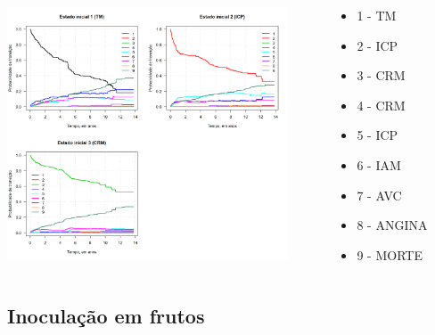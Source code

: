 \begin{frame}

\vspace{-.35cm}\begin{columns}
 \begin{column}{.9\textwidth}
  \begin{center}
   \includegraphics*[height = 7.5cm]{mass_mstate.png}
  \end{center}
 \end{column}
 \tiny
 \begin{column}{.25\textwidth}
  \begin{center}
   \begin{itemize}
    \item 1 - TM
    \item 2 - ICP
    \item 3 - CRM
    \item 4 - CRM
    \item 5 - ICP
    \item 6 - IAM
    \item 7 - AVC
    \item 8 - ANGINA
    \item 9 - MORTE
   \end{itemize}
  \end{center}
 \end{column}
\end{columns}

\end{frame}

\subsection{Inoculação em frutos}\label{inoculacao-em-frutos}

